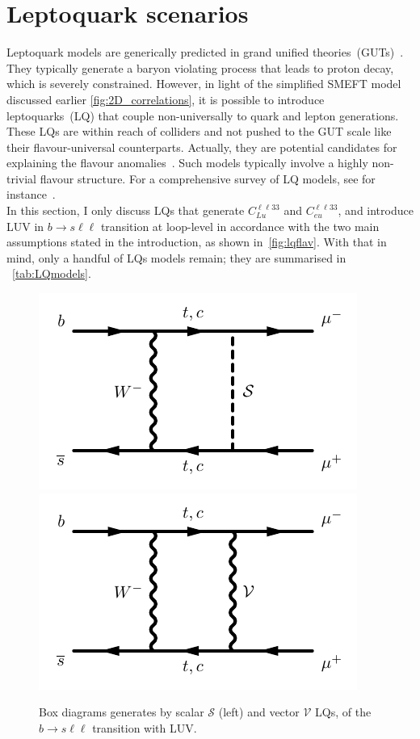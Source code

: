 \section{Leptoquark scenarios}
\label{sec:mod_Leptoquarks}
Leptoquark models are generically predicted in grand unified  theories~(GUTs)~\cite{Pati:1974yy,PhysRevLett.32.438}. They typically generate a baryon violating process that leads to proton decay, which is severely constrained. However, in light of the simplified SMEFT model discussed earlier \autoref{fig:2D_correlations}, it is possible to introduce leptoquarks~(LQ) that couple non-universally to quark and lepton generations.  These LQs are within reach of colliders and not pushed to the GUT scale like their flavour-universal counterparts. Actually, they are potential candidates for explaining the flavour anomalies~\cite{Camargo-Molina:2018cwu,Coy:2019rfr}.  Such models typically involve a highly non-trivial flavour structure.  For a comprehensive survey of LQ models, see for instance~\cite{Buchmuller:1986zs,delAguila:2010mx,Alonso:2015sja,Dorsner:2016wpm,deBlas:2017xtg}. \\
In this section, I only discuss LQs that generate  $C_ {Lu}^{\ell \ell33}$ and $C_{eu}^{\ell \ell33} $, and introduce LUV in $b \to s \ell \ell$ transition at loop-level in accordance with the two main assumptions stated in the introduction, as shown in~\autoref{fig:lqflav}. With that in mind, only a handful of LQs models remain; they are summarised in ~\autoref{tab:LQmodels}.
\begin{figure}[htpb!]
	\centering 
	\includegraphics[width=0.45\linewidth]{figures/x_bsllSLQ}
	\includegraphics[width=0.45\linewidth]{figures/x_bsllVLQ}
	\caption{Box diagrams generates by scalar $\mathcal S$ (left) and vector $\mathcal V$ LQs, of the $b \to s \ell \ell$ transition with LUV. }    
	\label{fig:lqflav}
\end{figure}
